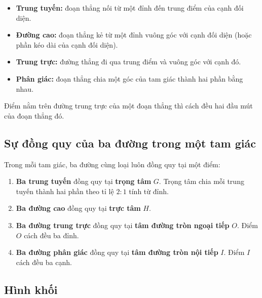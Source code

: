 \documentclass[12pt,a4paper]{article}
\begin{document}
\begin{dinhnghia}
\begin{itemize}
  \item \textbf{Trung tuyến:} đoạn thẳng nối từ một đỉnh đến trung điểm của cạnh đối diện.
  \item \textbf{Đường cao:} đoạn thẳng kẻ từ một đỉnh vuông góc với cạnh đối diện (hoặc phần kéo dài của cạnh đối diện).
  \item \textbf{Trung trực:} đường thẳng đi qua trung điểm và vuông góc với cạnh đó.
  \item \textbf{Phân giác:} đoạn thẳng chia một góc của tam giác thành hai phần bằng nhau.
\end{itemize}
\end{dinhnghia}

\begin{tinhchat}[title={Tính chất trung trực}]
Điểm nằm trên đường trung trực của một đoạn thẳng thì cách đều hai đầu mút của đoạn thẳng đó.
\end{tinhchat}

\subsection{Sự đồng quy của ba đường trong một tam giác}

\begin{dinhly}[title={Bốn loại đường đồng quy}]
Trong mỗi tam giác, ba đường cùng loại luôn đồng quy tại một điểm:
\begin{enumerate}[label=(\arabic*)]
  \item \textbf{Ba trung tuyến} đồng quy tại \textbf{trọng tâm} $G$. Trọng tâm chia mỗi trung tuyến thành hai phần theo tỉ lệ $2:1$ tính từ đỉnh.
  \item \textbf{Ba đường cao} đồng quy tại \textbf{trực tâm} $H$.
  \item \textbf{Ba đường trung trực} đồng quy tại \textbf{tâm đường tròn ngoại tiếp} $O$. Điểm $O$ cách đều ba đỉnh.
  \item \textbf{Ba đường phân giác} đồng quy tại \textbf{tâm đường tròn nội tiếp} $I$. Điểm $I$ cách đều ba cạnh.
\end{enumerate}
\end{dinhly}

\subsection{Hình khối}
\end{document}

